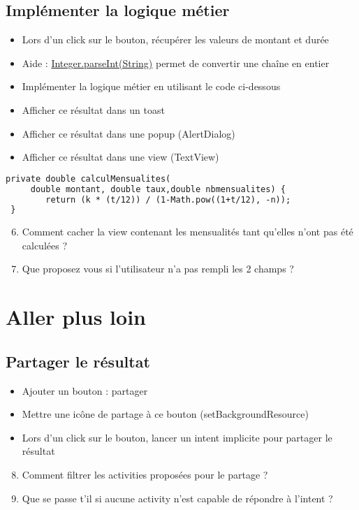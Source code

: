 \documentclass{article}
\begin{document}
\subsection{Implémenter la logique métier}
\begin{itemize}
\item Lors d'un click sur le bouton, récupérer les valeurs de montant et durée
\item Aide : \href{http://developer.android.com/reference/java/lang/Integer.html#parseInt(java.lang.String)}{Integer.parseInt(String)} permet de convertir une chaîne en entier
\item Implémenter la logique métier en utilisant le code ci-dessous
\item Afficher ce résultat dans un toast
\item Afficher ce résultat dans une popup (AlertDialog)
\item Afficher ce résultat dans une view (TextView)
\end{itemize}
 \begin{lstlisting}[language=XML]
 private double calculMensualites(
     double montant, double taux,double nbmensualites) {
    	return (k * (t/12)) / (1-Math.pow((1+t/12), -n));
 }
\end{lstlisting}

\begin{enumerate}
 \setcounter{enumi}{5}
\item Comment cacher la view contenant les mensualités tant qu'elles n'ont pas été calculées ?
\item Que proposez vous si l'utilisateur n'a pas rempli les 2 champs ?
\end{enumerate}
\newpage
\section{Aller plus loin}
\subsection{Partager le résultat}
\begin{itemize}
\item Ajouter un bouton : partager
\item Mettre une icône de partage à ce bouton (setBackgroundResource)
\item Lors d'un click sur le bouton, lancer un intent implicite pour partager le résultat
\end{itemize}
\begin{enumerate}
 \setcounter{enumi}{7}
\item Comment filtrer les activities proposées pour le partage ?
\item Que se passe t'il si aucune activity n'est capable de répondre à l'intent ?
\end{enumerate}
\end{document}
